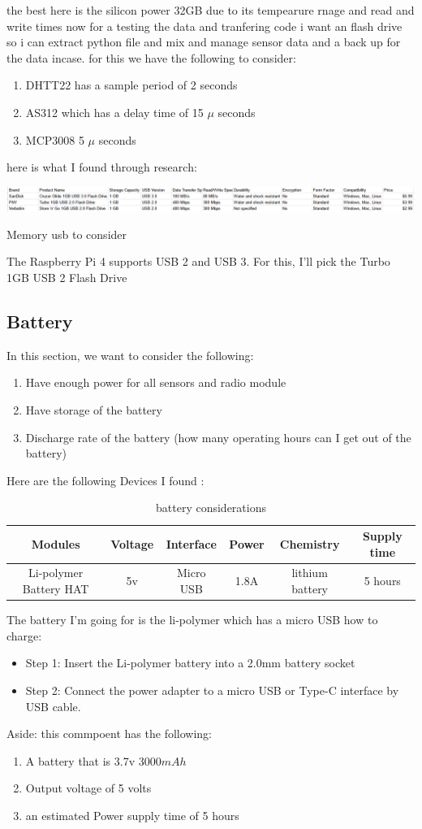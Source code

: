 the best here is the silicon power 32GB due to its tempearure rnage and read and write times
now for a  testing the data  and  tranfering  code i want  an flash drive so  i can  extract  python file and  mix and  manage  sensor data and  a back up for the data incase.
for this we have  the  following to consider:
\begin{enumerate}
	\item DHTT22 has a sample period of  2 seconds
	\item AS312 which has a  delay time of 15 $\mu$ seconds
	\item MCP3008 5 $\mu$ seconds
\end{enumerate}
here is what I found through research:
\begin{table}[h!]
	\centering
	\includegraphics[width=0.8\linewidth]{Images/memory_devices.png}
	\caption{Memory usb to consider}
	\label{Memory usb to consider}
\end{table}
The Raspberry Pi 4 supports USB 2 and  USB 3. For this, I'll pick the Turbo 1GB USB 2 Flash Drive

\subsection{Battery}
In this section, we want to consider the  following:
\begin{enumerate}
	\item Have enough power for all  sensors  and  radio module
	\item Have storage of the battery
	\item Discharge rate of the  battery (how many operating hours can I get out of the  battery)
\end{enumerate}
Here are the following  Devices I found :
\begin{table}[h!]
	\centering
	\begin{tabular}{|c|c|c|c|c|c|}
		\hline
		Modules & Voltage & Interface & Power & Chemistry & Supply time\\
		\hline
			Li-polymer Battery HAT  & 5v & Micro USB & 1.8A &lithium battery &5 hours \\ \hline
	\end{tabular}
	\caption{battery considerations}
	\label{battery considerations}
\end{table}

The battery I'm going for is the li-polymer which has a micro USB 
how to charge:
\begin{itemize}
	\item Step 1: Insert the Li-polymer battery into a 2.0mm battery socket
	\item Step 2: Connect the power adapter to a micro USB or Type-C interface by USB cable.
\end{itemize}
Aside: this commpoent has the following:
\begin{enumerate}
	\item A battery that is 3.7v 3000$mAh$ 
	\item Output voltage of 5 volts
	\item an estimated Power supply time  of  5 hours
\end{enumerate}
